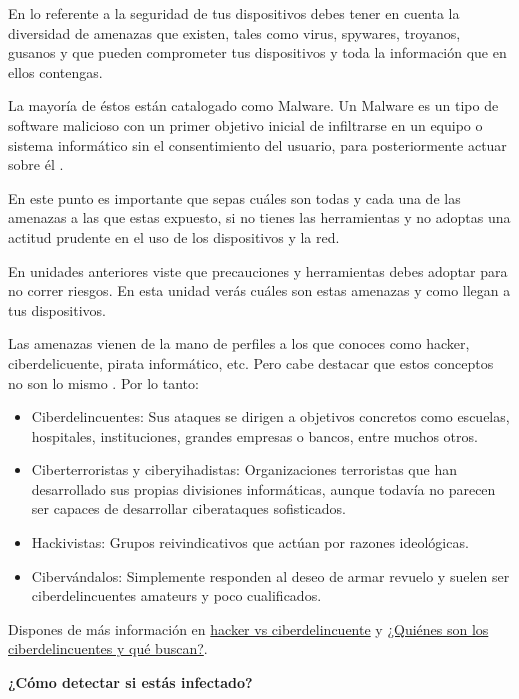 \documentclass[
  a4paper,
  openany]{book}
\begin{document}
En lo referente a la seguridad de tus dispositivos debes tener en cuenta la diversidad de amenazas que existen, tales como virus, spywares, troyanos, gusanos y que pueden comprometer tus dispositivos y toda la información que en ellos contengas.

La mayoría de éstos están catalogado como Malware. Un Malware es un tipo de software malicioso con un primer objetivo inicial de infiltrarse en un equipo o sistema informático sin el consentimiento del usuario, para posteriormente actuar sobre él \citep{WIKI-malware}.

En este punto es importante que sepas cuáles son todas y cada una de las amenazas a las que estas expuesto, si no tienes las herramientas y no adoptas una actitud prudente en el uso de los dispositivos y la red.

En unidades anteriores viste que precauciones y herramientas debes adoptar para no correr riesgos. En esta unidad verás cuáles son estas amenazas y como llegan a tus dispositivos.

Las amenazas vienen de la mano de perfiles a los que conoces como hacker, ciberdelicuente, pirata informático, etc. Pero cabe destacar que estos conceptos no son lo mismo \citep{OSPI-ciberseguridad-espana}. Por lo tanto:

\begin{itemize}
\item
  Ciberdelincuentes: Sus ataques se dirigen a objetivos concretos como escuelas, hospitales, instituciones, grandes empresas o bancos, entre muchos otros.
\item
  Ciberterroristas y ciberyihadistas: Organizaciones terroristas que han desarrollado sus propias divisiones informáticas, aunque todavía no parecen ser capaces de desarrollar ciberataques sofisticados.
\item
  Hackivistas: Grupos reivindicativos que actúan por razones ideológicas.
\item
  Cibervándalos: Simplemente responden al deseo de armar revuelo y suelen ser ciberdelincuentes amateurs y poco cualificados.
\end{itemize}

Dispones de más información en \href{https://www.incibe.es/aprendeciberseguridad/hacker-vs-ciberdelincuente}{hacker vs ciberdelincuente} y \href{https://www.osi.es/es/campanas/los-ciberdelincuentes-quienes-son/quienes-son-los-ciberdelincuentes-y-que-buscan}{¿Quiénes son los ciberdelincuentes y qué buscan?}.

\textbf{¿Cómo detectar si estás infectado?}
\end{document}

